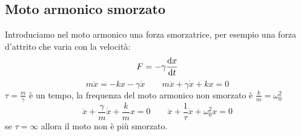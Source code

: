 \subsection{Moto armonico smorzato}
Introduciamo nel moto armonico una forza smorzatrice, per esempio una forza d'attrito che varia con la velocità:
\begin{equation*}F=-\gamma \frac{\mathrm{d} x}{\mathrm{d} t}\end{equation*}
\begin{equation*}m\ddot x=-kx-\gamma\dot x\qquad m\ddot x+\gamma\dot x+kx=0\end{equation*}
$\tau=\frac{m}{\gamma}$ è un tempo, la frequenza del moto armonico non smorzato è $\frac{k}{m}=\omega_0^2$
\begin{equation*}\ddot x+\frac{\gamma}{m}\dot x+\frac{k}{m}x=0\qquad \ddot x+\frac{1}{\tau}\dot x+\omega_0^2x=0\end{equation*}
se $\tau=\infty$ allora il moto non è più smorzato.

